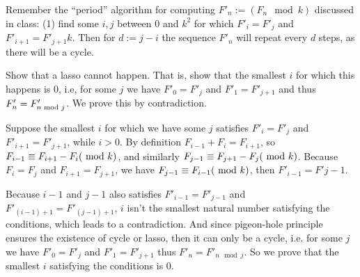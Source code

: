 \documentclass[11pt,a4paper,oneside]{article}
\begin{document}
\begin{problem}{6}
    \statement
    Remember the ``period'' algorithm for computing $F'_n := (F_n \mod k)$ discussed in class:
    (1) find some $i,j$ between $0$ and $k^2$ for which 
    $F'_{i} =  F'_{j}$ and $F'_{i+1} = F'_{j+1} k$. 
    Then for $d := j-i$ the sequence $F'_{n}$ will repeat every $d$ steps, as there will be a cycle.
    
    Show that a lasso cannot happen. That is, show 
    that the smallest $i$ for which this happens is $0$, i.e, for some $j$ we have
    $F'_0 = F'_j$ and $F'_1 = F'_{j+1}$ and thus $F'_n = F'_{n \textnormal{ mod }  j}$.
    \solution
    We prove this by contradiction.

    Suppose the smallest $i$ for which we have some $j$ satisfies $F'_i = F'_j$ and $F'_{i+1} = F'_{j+1}$, while $i>0$. By definition $F_{i-1}+F_i=F_{i+1}$, so $F_{i-1} \equiv  F_{i+1}-F_i(\textnormal{ mod }  k)$, and similarly $F_{j-1} \equiv  F_{j+1}-F_j(\textnormal{ mod }  k)$. Because $F_i = F_j$ and $F_{i+1} = F_{j+1}$, we have $F_{j-1} \equiv F_{i-1}(\textnormal{ mod }  k)$, then $F'_{i-1} = F'{j-1}$.

    Because $i-1$ and $j-1$ also satisfies $F'_{i-1} = F'_{j-1}$ and $F'_{(i-1)+1} = F'_{(j-1)+1}$, $i$ isn't the smallest natural number satisfying the conditions, which leads to a contradiction. And since pigeon-hole principle ensures the existence of cycle or lasso, then it can only be a cycle, i.e. for some $j$ we have $F'_0 = F'_j$ and $F'_1 = F'_{j + 1}$ thus $F'_n = F' _{n \mod j}$. So we prove that the smallest $i$ satisfying the conditions is $0$.
\end{problem}
\end{document}
